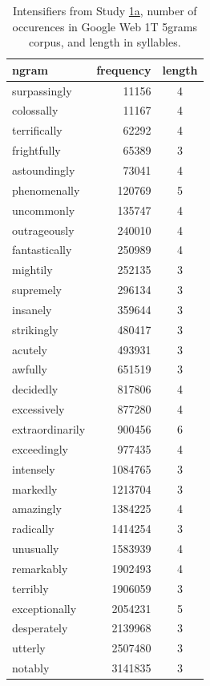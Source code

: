 \begin{table}[hbt]
 \begin{center}
 \footnotesize
  \caption{Intensifiers from Study \hyperref[sec:study1a]{1a}, number of occurences in Google Web 1T 5grams corpus, and length in syllables.}
  \label{table:intensifiers_study1a}
  \begin{tabular}{lrc}
   \hline
   ngram & frequency & length \\
    \hline
    surpassingly & 11156 & 4 \\
    colossally & 11167 & 4 \\
    terrifically & 62292 & 4 \\
    frightfully & 65389 & 3 \\
    astoundingly & 73041 & 4 \\
    phenomenally & 120769 & 5 \\
    uncommonly & 135747 & 4 \\
    outrageously & 240010 & 4 \\
    fantastically & 250989 & 4 \\
    mightily & 252135 & 3 \\
    supremely & 296134 & 3 \\
    insanely & 359644 & 3 \\
    strikingly & 480417 & 3 \\
    acutely & 493931 & 3 \\
    awfully & 651519 & 3 \\
    decidedly & 817806 & 4 \\
    excessively & 877280 & 4 \\
    extraordinarily & 900456 & 6 \\
    exceedingly & 977435 & 4 \\
    intensely & 1084765 & 3 \\
    markedly & 1213704 & 3 \\
    amazingly & 1384225 & 4 \\
    radically & 1414254 & 3 \\
    unusually & 1583939 & 4 \\
    remarkably & 1902493 & 4 \\
    terribly & 1906059 & 3 \\
    exceptionally & 2054231 & 5 \\
    desperately & 2139968 & 3 \\
    utterly & 2507480 & 3 \\
    notably & 3141835 & 3 \\

\end{tabular}
\end{center}
\end{table}
